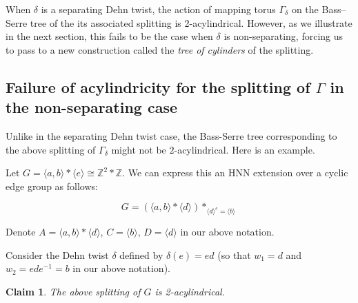 \documentclass{amsart}
\newcommand{\Z}{\mathbb{Z}}
\theoremstyle{plain}
\newtheorem{claim}[thm]{Claim}
\theoremstyle{definition}
\theoremstyle{remark}
\begin{document}
When $\delta$ is a separating Dehn twist, the action of mapping torus $\Gamma_{\delta}$ on the Bass--Serre tree of the its associated splitting is 2-acylindrical. However, as we illustrate in the next section, this fails to be the case when $\delta$ is non-separating, forcing us to pass to a new construction called the \textit{tree of cylinders} of the splitting.

\subsection{Failure of acylindricity for the splitting of $\Gamma$ in the non-separating case}

Unlike in the separating Dehn twist case, the Bass-Serre tree corresponding to the above splitting of $\Gamma_{\delta}$ might not be $2$-acylindrical. Here is an example.

Let $G = \langle a,b \rangle * \langle e \rangle \cong \Z^2 * \Z$. We can express this an HNN extension over a cyclic edge group as follows: 

$$G = (\langle a,b \rangle * \langle d \rangle)*_{\langle d \rangle^e = \langle b \rangle}$$

Denote $A = \langle a,b \rangle * \langle d \rangle$, $C = \langle b \rangle$, $D = \langle d \rangle$ in our above notation. 

Consider the Dehn twist $\delta$ defined by $\delta(e) = ed$ (so that $w_1 = d$ and $w_2 = ede^{-1} = b$ in our above notation). 

\begin{claim}
    The above splitting of $G$ is 2-acylindrical.
\end{claim}
\end{document}
